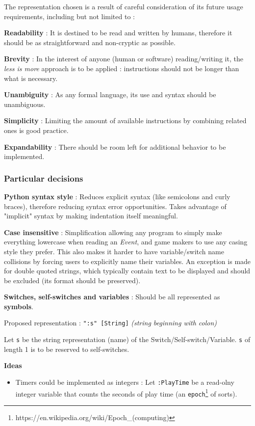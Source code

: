 \documentclass[11pt]{article}
\begin{document}
{The representation chosen is a result of careful consideration of its future usage requirements, including but not limited to :

\textbf{Readability} : It is destined to be read and written by humans, therefore it should be as straightforward and non-cryptic as possible.

\textbf{Brevity} : In the interest of anyone (human or software) reading/writing it, the \textit{less is more} approach is to be applied : instructions should not be longer than what is necessary.

\textbf{Unambiguity} : As any formal language, its use and syntax should be unambiguous.

\textbf{Simplicity} : Limiting the amount of available instructions by combining related ones is good practice.

\textbf{Expandability} : There should be room left for additional behavior to be implemented.



\subsubsection{Particular decisions}


\textbf{Python syntax style} : Reduces explicit syntax (like semicolons and curly braces), therefore reducing syntax error opportunities. Takes advantage of "implicit" syntax by making indentation itself meaningful.

\textbf{Case insensitive} : Simplification allowing any program to simply make everything lowercase when reading an \textit{Event}, and game makers to use any casing style they prefer. This also makes it harder to have variable/switch name collisions by forcing users to explicitly name their variables. An exception is made for double quoted strings, which typically contain text to be displayed and should be excluded (its format should be preserved).

\textbf{Switches, self-switches and variables} : Should be all represented as \textbf{symbols}. 

Proposed representation : \verb|":s" [String]| \textit{(string beginning with colon)}

Let \verb|s| be the string representation (name) of the Switch/Self-switch/Variable. \verb|s| of length 1 is to be reserved to self-switches.


\textbf{Ideas}
\begin{itemize}
	\item Timers could be implemented as integers : Let \verb|:PlayTime| be a read-olny integer variable that counts the seconds of play time (an \texttt{epoch}\footnote{https://en.wikipedia.org/wiki/Epoch\_(computing)} of sorts).
	

\end{itemize}}
\end{document}
